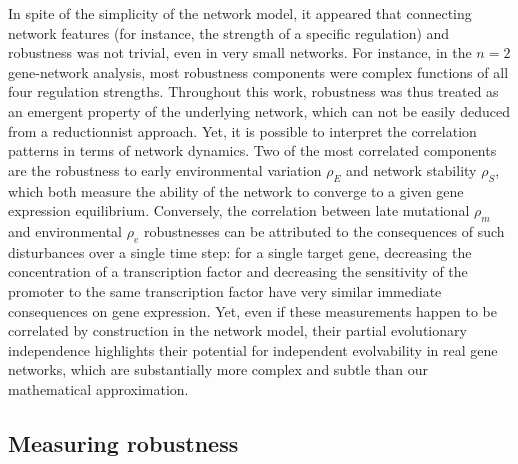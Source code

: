 \documentclass[10pt,a4paper]{article}
\newcommand{\stability}{{\rho_S}}
\newcommand{\earlyenv}{{\rho_E}}
\newcommand{\lateenv}{{\rho_e}}
\newcommand{\latemut}{{\rho_m}}
\begin{document}
In spite of the simplicity of the network model, it appeared that connecting network features (for instance, the strength of a specific regulation) and robustness was not trivial, even in very small networks. For instance, in the $n=2$ gene-network analysis, most robustness components were complex functions of all four regulation strengths. Throughout this work, robustness was thus treated as an emergent property of the underlying network, which can not be easily deduced from a reductionnist approach. Yet, it is possible to interpret the correlation patterns in terms of network dynamics. Two of the most correlated components are the robustness to early environmental variation $\earlyenv$ and network stability $\stability$, which both measure the ability of the network to converge to a given gene expression equilibrium. Conversely, the correlation between late mutational $\latemut$ and environmental $\lateenv$ robustnesses can be attributed to the consequences of such disturbances over a single time step: for a single target gene, decreasing the concentration of a transcription factor and decreasing the sensitivity of the promoter to the same transcription factor have very similar immediate consequences on gene expression. Yet, even if these measurements happen to be correlated by construction in the network model, their partial evolutionary independence highlights their potential for independent evolvability in real gene networks, which are substantially more complex and subtle than our mathematical approximation. 

\subsection{Measuring robustness}
\end{document}

